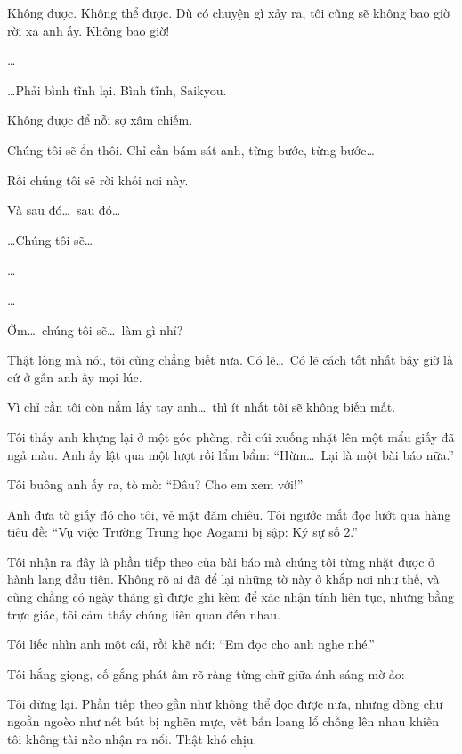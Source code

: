 \documentclass[../main.tex]{subfiles}
\begin{document}
Không được. Không thể được. Dù có chuyện gì xảy ra, tôi cũng sẽ không bao giờ rời xa anh ấy. Không bao giờ!

\dots

\dots Phải bình tĩnh lại. Bình tĩnh, Saikyou.

Không được để nỗi sợ xâm chiếm.

Chúng tôi sẽ ổn thôi. Chỉ cần bám sát anh, từng bước, từng bước\dots

Rồi chúng tôi sẽ rời khỏi nơi này.

Và sau đó\dots\ sau đó\dots

\dots Chúng tôi sẽ\dots

\dots

\dots

Ờm\dots\ chúng tôi sẽ\dots\ làm gì nhỉ?

Thật lòng mà nói, tôi cũng chẳng biết nữa. Có lẽ\dots\ Có lẽ cách tốt nhất bây giờ là cứ ở gần anh ấy mọi lúc.

Vì chỉ cần tôi còn nắm lấy tay anh\dots\ thì ít nhất tôi sẽ không biến mất.

Tôi thấy anh khựng lại ở một góc phòng, rồi cúi xuống nhặt lên một mẩu giấy đã ngả màu. Anh ấy lật qua một lượt rồi lẩm bẩm: ``Hừm\dots\ Lại là một bài báo nữa.''

Tôi buông anh ấy ra, tò mò: ``Đâu? Cho em xem với!''

Anh đưa tờ giấy đó cho tôi, vẻ mặt đăm chiêu. Tôi ngước mắt đọc lướt qua hàng tiêu đề: ``{\vnmsans Vụ việc Trường Trung học Aogami bị sập: Ký sự số 2.}''

Tôi nhận ra đây là phần tiếp theo của bài báo mà chúng tôi từng nhặt được ở hành lang đầu tiên. Không rõ ai đã để lại những tờ này ở khắp nơi như thế, và cũng chẳng có ngày tháng gì được ghi kèm để xác nhận tính liên tục, nhưng bằng trực giác, tôi cảm thấy chúng liên quan đến nhau.

Tôi liếc nhìn anh một cái, rồi khẽ nói: ``Em đọc cho anh nghe nhé.''

Tôi hắng giọng, cố gắng phát âm rõ ràng từng chữ giữa ánh sáng mờ ảo:


Tôi dừng lại. Phần tiếp theo gần như không thể đọc được nữa, những dòng chữ ngoằn ngoèo như nét bút bị nghẽn mực, vết bẩn loang lổ chồng lên nhau khiến tôi không tài nào nhận ra nổi. Thật khó chịu.
\end{document}
